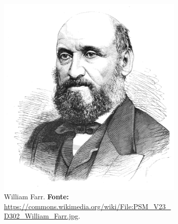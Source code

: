 \begin{figure}[!htp]
\centering
\caption{Quatro pioneiros do higienismo britânico.}
\begin{footnotesize}
	\begin{subfigure}[b]{0.4\linewidth}
		\includegraphics[width=1\textwidth]{2-cap1/complementos/fotos/PSM_V23_D302_William_Farr.jpg}
		\caption{William Farr. \textbf{Fonte:} \url{https://commons.wikimedia.org/wiki/File:PSM_V23_D302_William_Farr.jpg}.}
		\label{fig:williamfarr}
	\end{subfigure}
	\
	\begin{subfigure}[b]{0.4\linewidth}
		\centering

\end{subfigure}
\end{footnotesize}
\end{figure}
